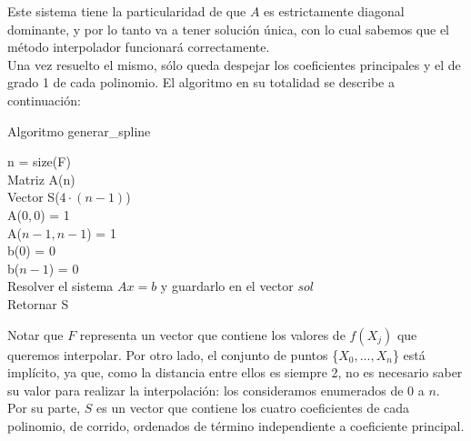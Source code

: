 \documentclass[a4paper]{article}
\begin{document}
\bigskip
Este sistema tiene la particularidad de que $A$ es estrictamente diagonal dominante, y por lo tanto va a tener solución única, con lo cual sabemos que el método interpolador funcionará correctamente. \\

Una vez resuelto el mismo, sólo queda despejar los coeficientes principales y el de grado 1 de cada polinomio. El algoritmo en su totalidad se describe a continuación:

\IncMargin{1em}
\begin{algorithm}[h!]
\NoCaptionOfAlgo
\caption{Algoritmo generar_spline}

\bigskip

n = size(F)\\
Matriz A(n)\\
Vector S($4\cdot(n-1)$)\\
\bigskip
A($0,0$) = 1\\
A($n-1,n-1$) = 1\\
b($0$) = $0$\\
b($n-1$) = $0$\\
\bigskip
{}
\bigskip
Resolver el sistema $Ax=b$ y guardarlo en el vector $sol$\\
\bigskip
{}
\bigskip
Retornar S
\end{algorithm}\DecMargin{1em}

\bigskip
Notar que $F$ representa un vector que contiene los valores de $f(X_j)$ que queremos interpolar. Por otro lado, el conjunto de puntos \{\(X_0, ..., X_n\)\} está implícito, ya que, como la distancia entre ellos es siempre 2, no es necesario saber su valor para realizar la interpolación: los consideramos enumerados de 0 a $n$. \\
\indent Por su parte, $S$ es un vector que contiene los cuatro coeficientes de cada polinomio, de corrido, ordenados de término independiente a coeficiente principal. \\
\end{document}
